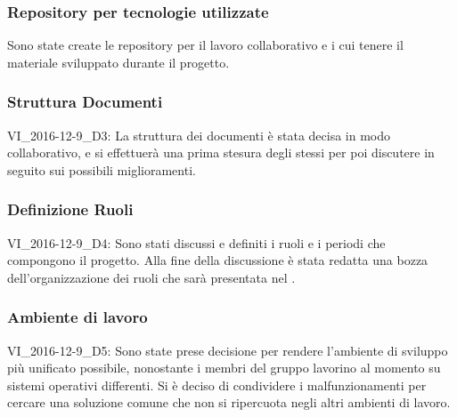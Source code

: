 \subsubsection{Repository per tecnologie utilizzate}
Sono state create le repository per il lavoro collaborativo e i cui tenere il materiale sviluppato durante il progetto.

\subsubsection{Struttura Documenti}
VI\_2016-12-9\_D3: La struttura dei documenti è stata decisa in modo collaborativo, e si effettuerà una prima stesura degli stessi per poi discutere in seguito sui possibili miglioramenti.

\subsubsection{Definizione Ruoli}
VI\_2016-12-9\_D4: Sono stati discussi e definiti i ruoli e i periodi che compongono il progetto.
Alla fine della discussione è stata redatta una bozza dell'organizzazione dei ruoli che sarà presentata nel \PianoDiProgetto{}.

\subsubsection{Ambiente di lavoro}
VI\_2016-12-9\_D5: Sono state prese decisione per rendere l'ambiente di sviluppo più unificato possibile, nonostante i membri del gruppo lavorino al momento su sistemi operativi differenti.
Si è deciso di condividere i malfunzionamenti per cercare una soluzione comune che non si ripercuota negli altri ambienti di lavoro.

\clearpage
